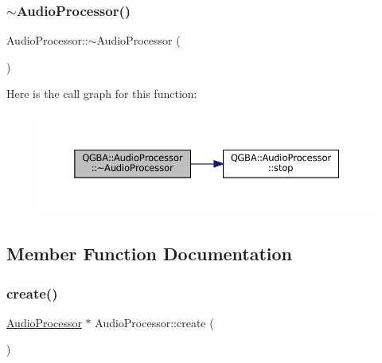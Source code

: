 \subsubsection{\texorpdfstring{$\sim$\+Audio\+Processor()}{~AudioProcessor()}}
{\footnotesize\ttfamily Audio\+Processor\+::$\sim$\+Audio\+Processor (\begin{DoxyParamCaption}{ }\end{DoxyParamCaption})}

Here is the call graph for this function\+:
\nopagebreak
\begin{figure}[H]
\begin{center}
\leavevmode
\includegraphics[width=350pt]{class_q_g_b_a_1_1_audio_processor_a3f4e00da5cea8cd62f0325abc050a0d2_cgraph}
\end{center}
\end{figure}


\subsection{Member Function Documentation}
\mbox{\label{class_q_g_b_a_1_1_audio_processor_a699614d282aa9cf042df8d23b9b5923a}} 
\subsubsection{\texorpdfstring{create()}{create()}}
{\footnotesize\ttfamily \mbox{\hyperlink{class_q_g_b_a_1_1_audio_processor}{Audio\+Processor}} $\ast$ Audio\+Processor\+::create (\begin{DoxyParamCaption}{ }\end{DoxyParamCaption})\hspace{0.3cm}{\ttfamily [static]}}

